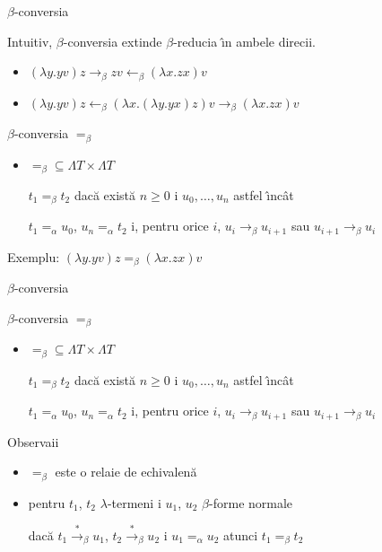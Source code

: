 \documentclass[xcolor=pdftex,romanian,colorlinks]{beamer}
\newcommand{\ra}{\rightarrow}
\newcommand{\sra}{\stackrel{*}{\rightarrow}}
\begin{document}
\begin{frame}[fragile]{$\beta$-conversia}

Intuitiv, $\beta$-conversia extinde $\beta$-reduc\ts ia \^{\i}n ambele direc\ts ii. 



\begin{itemize}
\item $(\lambda y. yv) z\ra_\beta zv \leftarrow_\beta (\lambda x.zx)v$\pause

\item $(\lambda y. yv) z\leftarrow_\beta (\lambda x.(\lambda y.yx)z)v \ra_\beta (\lambda x.zx)v$
\end{itemize}
\pause

\begin{block}{$\beta$-conversia  $=_\beta$}
\begin{itemize}
\item $=_\beta\subseteq \Lambda T\times \Lambda T$

$t_1=_\beta  t_2$ dac\u a  exist\u a $n\geq 0$ \sh i $u_0,\ldots, u_n$ astfel \^{\i}nc\^{a}t

$t_1=_\alpha u_0$, $u_n =_\alpha t_2$ \sh i, pentru orice $i$,
$u_i\ra_\beta u_{i+1}$ sau $u_{i+1}\ra_\beta u_{i}$

\end{itemize}
\end{block}

\pause

Exemplu: $(\lambda y. yv) z =_\beta (\lambda x.zx)v $
\end{frame}

\begin{frame}[fragile]{$\beta$-conversia}


\begin{block}{$\beta$-conversia  $=_\beta$}
\begin{itemize}
\item $=_\beta\subseteq \Lambda T\times \Lambda T$

$t_1=_\beta  t_2$ dac\u a  exist\u a $n\geq 0$ \sh i $u_0,\ldots, u_n$ astfel \^{\i}nc\^{a}t

$t_1=_\alpha u_0$, $u_n =_\alpha t_2$ \sh i, pentru orice $i$,
$u_i\ra_\beta u_{i+1}$ sau $u_{i+1}\ra_\beta u_{i}$

\end{itemize}
\end{block}\pause

\begin{block}{Observa\ts ii}
\begin{itemize}
\item $=_\beta$ este o rela\ts ie de echivalen\ts \u a\pause
\item pentru  $t_1$, $t_2$ $\lambda$-termeni \sh i $u_1$, $u_2$  $\beta$-forme normale 

dac\u a $t_1\sra_\beta u_1$, $t_2\sra_\beta u_2$ \sh i $u_1=_\alpha u_2$ atunci $t_1=_\beta t_2$
\end{itemize}
\end{block}

\end{frame}
\end{document}
